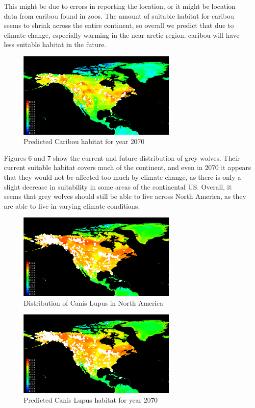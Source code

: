 \documentclass[twoside]{article}
\begin{document}
This might be due to errors in reporting the
location, or it might be location data from caribou found in zoos. The amount
of suitable habitat for caribou seems to shrink across the entire continent,
so overall we predict that due to climate change, especially warming in the
near-arctic region, caribou will have less suitable habitat in the future.


\begin{figure}[!ht]
\centering
\includegraphics[width=0.7\textwidth]{NCaribouFuture}
\caption{Predicted Caribou habitat for year 2070}
\end{figure}

\indent Figures 6 and 7 show the current and future distribution of grey wolves.
Their current suitable habitat covers much of the continent, and even in
2070 it appears that they would not be affected too much by climate change,
as there is only a slight decrease in suitability in some areas of the
continental US. Overall, it seems that grey wolves should still be able
to live across North America, as they are able to live in varying climate
conditions.

\begin{figure}[!ht]
\centering
\includegraphics[width=0.7\textwidth]{NCanisPresent}
\caption{Distribution of Canis Lupus in North America}
\end{figure}

\begin{figure}[!ht]
\centering
\includegraphics[width=0.7\textwidth]{NCanisFuture}
\caption{Predicted Canis Lupus habitat for year 2070}
\end{figure}
\end{document}

